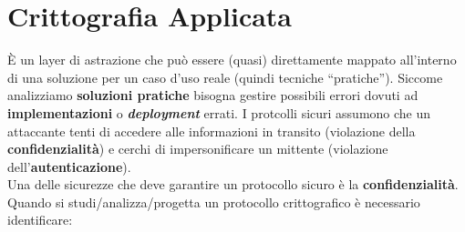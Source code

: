 \newpage
\section{Crittografia Applicata}
È un layer di astrazione che può essere (quasi) direttamente mappato all'interno di una soluzione per un caso d'uso reale (quindi tecniche ``pratiche''). Siccome analizziamo \textbf{soluzioni pratiche} bisogna gestire possibili errori dovuti ad \textbf{implementazioni} o \textbf{\textit{deployment}} errati. I protcolli sicuri assumono che un attaccante tenti di accedere alle informazioni in transito (violazione della \textbf{confidenzialità}) e cerchi di impersonificare un mittente (violazione dell'\textbf{autenticazione}). \\ 
Una delle sicurezze che deve garantire un protocollo sicuro è la \textbf{confidenzialità}. \\ \newline
Quando si studi/analizza/progetta un protocollo crittografico è necessario identificare:
